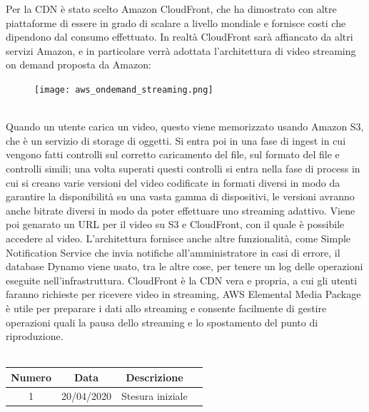 Per la CDN è stato scelto Amazon CloudFront, che ha dimostrato con altre piattaforme di essere in grado di scalare a livello mondiale e fornisce costi che dipendono dal consumo effettuato. In realtà CloudFront sarà affiancato da altri servizi Amazon, e in particolare verrà adottata l'architettura di video streaming on demand proposta da Amazon:\\
\begin{figure}[!h]
\centering
\texttt{[image: aws\_ondemand\_streaming.png]}
\end{figure}\\
Quando un utente carica un video, questo viene memorizzato usando Amazon S3, che è un servizio di storage di oggetti. Si entra poi in una fase di ingest in cui vengono fatti controlli sul corretto caricamento del file, sul formato del file e controlli simili; una volta superati questi controlli si entra nella fase di process in cui si creano varie versioni del video codificate in formati diversi in modo da garantire la disponibilità su una vasta gamma di dispositivi, le versioni avranno anche bitrate diversi in modo da poter effettuare uno streaming adattivo. Viene poi genarato un URL per il video su S3 e CloudFront, con il quale è possibile accedere al video. L'architettura fornisce anche altre funzionalità, come Simple Notification Service che invia notifiche all'amministratore in casi di errore, il database Dynamo viene usato, tra le altre cose, per tenere un log delle operazioni eseguite nell'infrastruttura. CloudFront è la CDN vera e propria, a cui gli utenti faranno richieste per ricevere video in streaming, AWS Elemental Media Package è utile per preparare i dati allo streaming e consente facilmente di gestire operazioni quali la pausa dello streaming e lo spostamento del punto di riproduzione.
\newline\newline
{} \\ \\
\begin{tabular}{|c | c | c | c|} 
 	\hline
	 Numero & Data & Descrizione \\ [0.5ex] 
	\hline\hline
	1 & 20/04/2020 & Stesura iniziale \\ 
	\hline
\end{tabular}